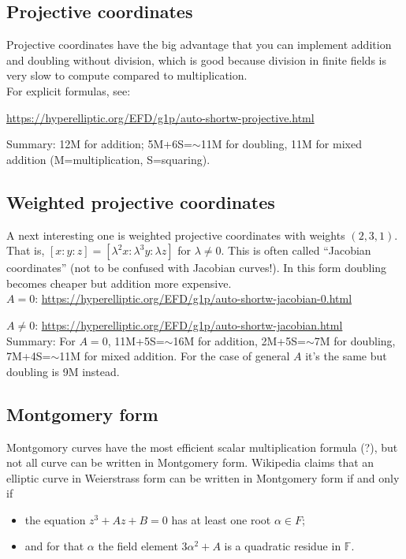 \documentclass[12pt,draft,a4paper,openany,oneside]{amsbook}
\def\F{\mathbb{F}}
\theoremstyle{plain}
\theoremstyle{definition}
\begin{document}
\subsection{Projective coordinates} 
Projective coordinates have the big advantage
that you can implement addition and doubling without division, which is good
because division in finite fields is very slow to compute compared to multiplication.\\

For explicit formulas, see:

\noindent
\url{https://hyperelliptic.org/EFD/g1p/auto-shortw-projective.html}

\noindent
Summary: 12M for addition; 5M+6S=$\sim$11M for doubling,
11M for mixed addition (M=multiplication, S=squaring).

\subsection{Weighted projective coordinates} 
A next interesting one is weighted projective
coordinates with weights $(2,3,1)$. That is, $[x:y:z] = [\lambda^2x:\lambda^3y:\lambda z]$
for $\lambda\neq0$. This is often called ``Jacobian coordinates'' (not to be confused
with Jacobian curves!). In this form doubling becomes cheaper but addition more expensive.\\

\noindent 
$A=0$:    \url{https://hyperelliptic.org/EFD/g1p/auto-shortw-jacobian-0.html}

\noindent
$A\neq0$: \url{https://hyperelliptic.org/EFD/g1p/auto-shortw-jacobian.html} \\

Summary: For $A=0$, 11M+5S=$\sim$16M for addition, 2M+5S=$\sim$7M for doubling,
7M+4S=$\sim$11M for mixed addition.
For the case of general $A$ it's the same but doubling is 9M instead.

\subsection{Montgomery form}
Montgomory curves have the most efficient scalar multiplication formula (?), but
not all curve can be written in Montgomery form. Wikipedia claims that an 
elliptic curve in Weierstrass form can be written in Montgomery form if and only if
\begin{itemize}
\item the equation $z^3 + Az + B=0$ has at least one root $\alpha\in F$;
\item and for that $\alpha$ the field element $3\alpha^2 + A$ is a quadratic residue in $\F$.
\end{itemize}
\end{document}

